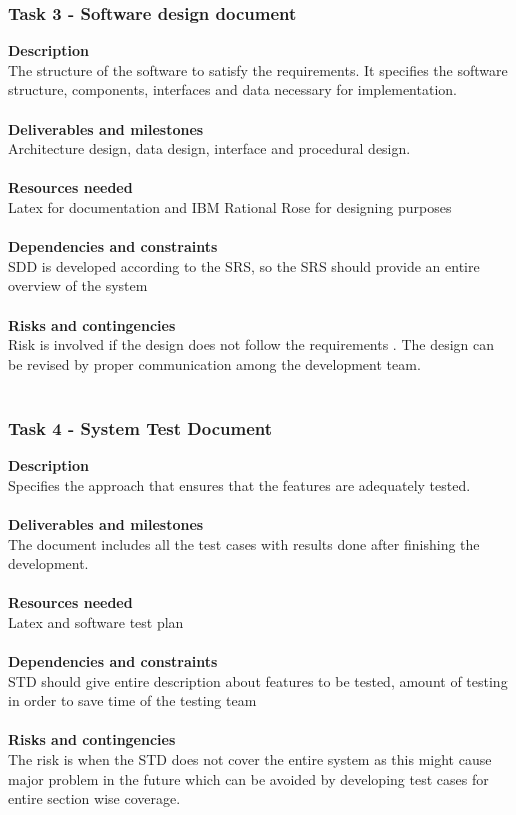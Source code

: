 \documentclass[10pt]{article}
\begin{document}
\subsubsection{Task 3 - Software design document}
\textbf{Description}\\
The structure of the software to satisfy the requirements. It specifies the software structure, components, interfaces and data necessary for implementation. \\ \\
\textbf{Deliverables and milestones}\\
Architecture design, data design, interface and procedural design.\\ \\
\textbf{Resources needed}\\
Latex for documentation and IBM Rational Rose for designing purposes\\ \\
\textbf{Dependencies and constraints}\\
SDD is developed according to the SRS, so the SRS should provide an entire overview of the system \\ \\
\textbf{Risks and contingencies}\\
Risk is involved if the design does not follow the requirements . The design can be revised by proper communication among the development team.\\ \\

\subsubsection{Task 4 - System Test Document}
\textbf{Description}\\
Specifies the approach that ensures that the features are adequately tested. \\ \\
\textbf{Deliverables and milestones}\\
The document includes all the test cases with results done after finishing the development.\\ \\
\textbf{Resources needed}\\
Latex and software test plan\\ \\
\textbf{Dependencies and constraints}\\
STD should give entire description about features to be tested, amount of testing in order to save time of the testing team\\ \\
\textbf{Risks and contingencies}\\
The risk is when the STD does not cover the entire system as this might cause major problem in the future which can be avoided by developing test cases for entire section wise coverage.\\ \\	
\newpage
\end{document}
